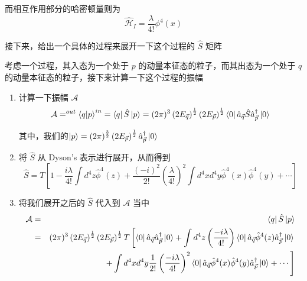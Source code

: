 而相互作用部分的哈密顿量则为
\begin{equation}
    \hat{\mathcal{H}}_I = \frac{\lambda}{4!}\phi^4(x)
\end{equation}

接下来，给出一个具体的过程来展开一下这个过程的 $\hat{S}$ 矩阵
\begin{example}
    考虑一个过程，其入态为一个处于 $p$ 的动量本征态的粒子，而其出态为一个处于 $q$ 的动量本征态的粒子，接下来计算一下这个过程的振幅
    \begin{solution}
        \begin{enumerate}
            \item[Step 1] 计算一下振幅 $\mathcal{A}$
            \begin{equation}
                \mathcal{A} = ^{out}\braket{q}{p}^{in} = \bra{q}\hat{S}\ket{p} = (2\pi)^3 \left(2E_{\vec{q}}\right)^{\frac{1}{2}} \left(2E_{\vec{p}}\right)^{\frac{1}{2}}\bra{0}\hat{a}_{\vec{q}}\hat{S}\hat{a}_{\vec{p}}^\dagger\ket{0}
            \end{equation}

            其中，我们的$\displaystyle \ket{p} = (2\pi)^\frac{3}{2} \left(2E_{\vec{p}}\right)^{\frac{1}{2}}\hat{a}_{\vec{p}}^\dagger\ket{0}$
            \item[Step 2] 将 $\hat{S}$ 从 Dyson's 表示进行展开，从而得到
            \begin{equation}
                \hat{S} = T\left[1 - \frac{i\lambda}{4!}\int d^4z \hat{\phi}^4(z) + \frac{\left(-i\right)^2}{2!}\left(\frac{\lambda}{4!}\right)^2 \int d^4 x d^4 y \hat{\phi}^4(x)\hat{\phi}^4(y) + \cdots\right]
            \end{equation}
            \item[Step 3] 将我们展开之后的 $\hat{S}$ 代入到 $\mathcal{A}$ 当中
            \begin{eqnarray*}
                \mathcal{A} &=& \bra{q}\hat{S}\ket{p} \\
                &=& (2\pi)^3 \left(2E_{\vec{q}}\right)^{\frac{1}{2}} \left(2E_{\vec{p}}\right)^{\frac{1}{2}} T\left[\bra{0}\hat{a}_{\vec{q}}\hat{a}_{\vec{p}}^\dagger\ket{0} + \int d^4z \left(\frac{-i\lambda}{4!}\right)\bra{0}\hat{a}_{\vec{q}}\hat{\phi}^4(z)\hat{a}_{\vec{p}}^\dagger\ket{0}\right. \\
                && \left. + \int d^4x d^4y \frac{1}{2!}\left(\frac{-i\lambda}{4!}\right)^2\bra{0}\hat{a}_{\vec{q}}\hat{\phi}^4(x)\hat{\phi}^4(y)\hat{a}_{\vec{p}}^\dagger\ket{0} + \cdots\right]
            \end{eqnarray*}


\end{enumerate}
\end{solution}
\end{example}
